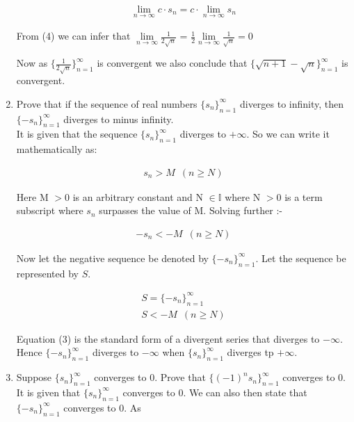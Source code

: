 \documentclass[11pt, letterpaper]{article}
\begin{document}
\begin{enumerate}
{	\begin{eqnarray}
		 \lim \limits_{n \to \infty} c \cdot s_n = c \cdot \lim \limits_{n \to \infty} s_n
	\end{eqnarray}
	
	From (4) we can infer that $\lim \limits_{n \to \infty} \frac{1}{2\sqrt{n}}$ = $\frac{1}{2} \lim \limits_{n \to \infty} \frac{1}{\sqrt{n}} = 0$
	
	Now as $ \lbrace \frac{1}{2\sqrt{n}} \rbrace_{n=1}^\infty $ is convergent we also conclude that $ \lbrace \sqrt{n+1} - \sqrt{n} \rbrace_{n=1}^\infty $ is convergent.
}

\item{Prove that if the sequence of real numbers $\lbrace s_n \rbrace_{n=1}^\infty$ diverges to infinity, then $\lbrace -s_n \rbrace_{n=1}^\infty$ diverges to minus infinity.\\
	It is given that the sequence $ \lbrace s_n \rbrace_{n=1}^\infty $ diverges to $+ \infty$. So we can write it mathematically as:
	
	\setcounter{equation}{0}
	
	\begin{eqnarray}
		s_n > M \,\,\, (n \geq N)
	\end{eqnarray}
	
	Here M $>0$ is an arbitrary constant and N $\in \mathbb{I}$ where N $>0$ is a term subscript where $s_n$ surpasses the value of M. Solving further :-
	
	\begin{eqnarray}
		-s_n < -M \,\,\, (n \geq N)
	\end{eqnarray}
	
	Now let the negative sequence be denoted by $ \lbrace -s_n \rbrace_{n=1}^\infty $. Let the sequence be represented by $S$.
	
	\begin{eqnarray}
		S =  \lbrace -s_n \rbrace_{n=1}^\infty \nonumber \\
		S < -M \,\,\, (n \geq N)
	\end{eqnarray}
	
	Equation (3) is the standard form of a divergent series that diverges to $-\infty$. Hence $ \lbrace -s_n \rbrace_{n=1}^\infty $ diverges to $-\infty$ when $ \lbrace s_n \rbrace_{n=1}^\infty $ diverges tp $+ \infty$.
}

\item{Suppose $\lbrace s_n \rbrace_{n=1}^\infty$ converges to 0. Prove that $\lbrace (-1)^n s_n \rbrace_{n=1}^\infty$ converges to 0.\\
	It is given that $ \lbrace s_n \rbrace_{n=1}^\infty $ converges to 0. We can also then state that $ \lbrace -s_n \rbrace_{n=1}^\infty $ converges to 0. As
	
}
\end{enumerate}
\end{document}
